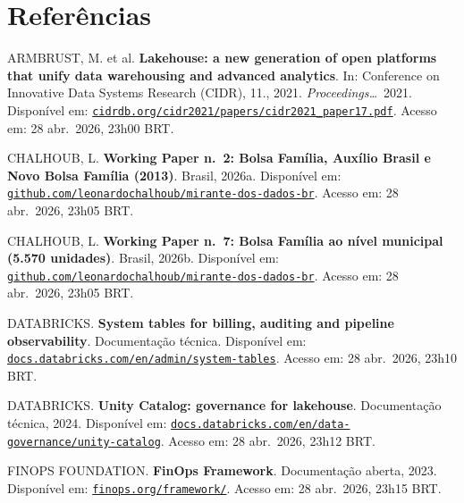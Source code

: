 \documentclass[12pt,a4paper,oneside]{article}
\begin{document}
\section*{Referências}
\begin{singlespace}\small

\noindent ARMBRUST, M. et al. \textbf{Lakehouse: a new generation
of open platforms that unify data warehousing and advanced
analytics}. In: Conference on Innovative Data Systems Research
(CIDR), 11., 2021. \textit{Proceedings\ldots}\
2021. Disponível em:
\href{https://www.cidrdb.org/cidr2021/papers/cidr2021_paper17.pdf}%
{\texttt{cidrdb.org/cidr2021/papers/cidr2021\_paper17.pdf}}.
Acesso em: 28 abr.\ 2026, 23h00 BRT.

\vspace{6pt}
\noindent CHALHOUB, L. \textbf{Working Paper n.\ 2: Bolsa Família,
Auxílio Brasil e Novo Bolsa Família (2013\textendash 2025)}.
Brasil, 2026a. Disponível em:
\href{https://github.com/leonardochalhoub/mirante-dos-dados-br/blob/main/articles/bolsa-familia.tex}%
{\texttt{github.com/leonardochalhoub/mirante-dos-dados-br}}.
Acesso em: 28 abr.\ 2026, 23h05 BRT.

\vspace{6pt}
\noindent CHALHOUB, L. \textbf{Working Paper n.\ 7: Bolsa Família
ao nível municipal (5.570 unidades)}.
Brasil, 2026b. Disponível em:
\href{https://github.com/leonardochalhoub/mirante-dos-dados-br/blob/main/articles/bolsa-familia-municipios.tex}%
{\texttt{github.com/leonardochalhoub/mirante-dos-dados-br}}.
Acesso em: 28 abr.\ 2026, 23h05 BRT.

\vspace{6pt}
\noindent DATABRICKS. \textbf{System tables for billing,
auditing and pipeline observability}. Documentação técnica.
Disponível em:
\href{https://docs.databricks.com/en/admin/system-tables/index.html}%
{\texttt{docs.databricks.com/en/admin/system-tables}}.
Acesso em: 28 abr.\ 2026, 23h10 BRT.

\vspace{6pt}
\noindent DATABRICKS. \textbf{Unity Catalog: governance for
lakehouse}. Documentação técnica, 2024. Disponível em:
\href{https://docs.databricks.com/en/data-governance/unity-catalog/index.html}%
{\texttt{docs.databricks.com/en/data-governance/unity-catalog}}.
Acesso em: 28 abr.\ 2026, 23h12 BRT.

\vspace{6pt}
\noindent FINOPS FOUNDATION. \textbf{FinOps Framework}.
Documentação aberta, 2023. Disponível em:
\href{https://www.finops.org/framework/}%
{\texttt{finops.org/framework/}}.
Acesso em: 28 abr.\ 2026, 23h15 BRT.


\end{singlespace}
\end{document}
